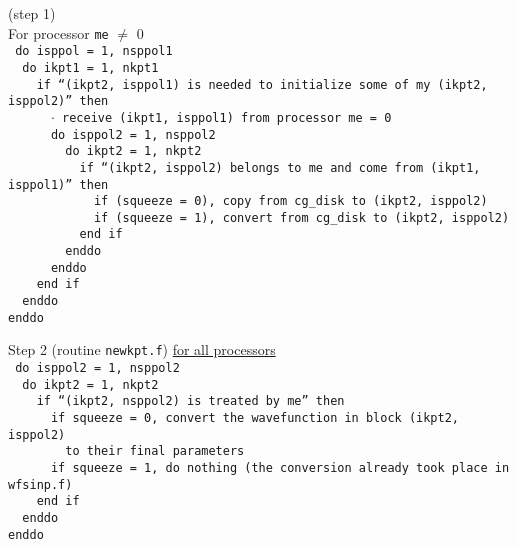 \documentclass{article}
\begin{document}
\label{sec:H4}
(step 1) \\
For processor {\tt me} $\neq$ 0 \\
{\tt
do isppol = 1, nsppol1 \\
\, do ikpt1 = 1, nkpt1 \\
\, \, if ``(ikpt2, isppol1) is needed to initialize some of \underline{my} (ikpt2, isppol2)'' then \\
\, \, \, $\cdot$ receive (ikpt1, isppol1) from processor me = 0 \\
\, \, \, do isppol2 = 1, nsppol2 \\
\, \, \, \, do ikpt2 = 1, nkpt2 \\
\, \, \, \, \, if ``(ikpt2, isppol2) belongs to me and come from (ikpt1, isppol1)'' then \\
\, \, \, \, \, \, if (squeeze = 0), copy from cg\_disk to (ikpt2, isppol2) \\
\, \, \, \, \, \, if (squeeze = 1), convert from cg\_disk to (ikpt2, isppol2) \\
\, \, \, \, \, end if \\
\, \, \, \, enddo \\
\, \, \, enddo \\
\, \, end if \\
\, enddo \\
enddo}

\label{sec:H5}
Step 2 (routine {\tt newkpt.f}) \underline{for all processors}\\
{\tt
do isppol2 = 1, nsppol2 \\
\, do ikpt2 = 1, nkpt2 \\
\, \, if ``(ikpt2, nsppol2) is treated by me'' then \\
\, \, \, if squeeze = 0, convert the wavefunction in block (ikpt2, isppol2) \\
\, \, \, \, to their final parameters \\
\, \, \, if squeeze = 1, do nothing (the conversion already took place in wfsinp.f) \\
\, \, end if \\
\, enddo \\
enddo}
\end{document}
